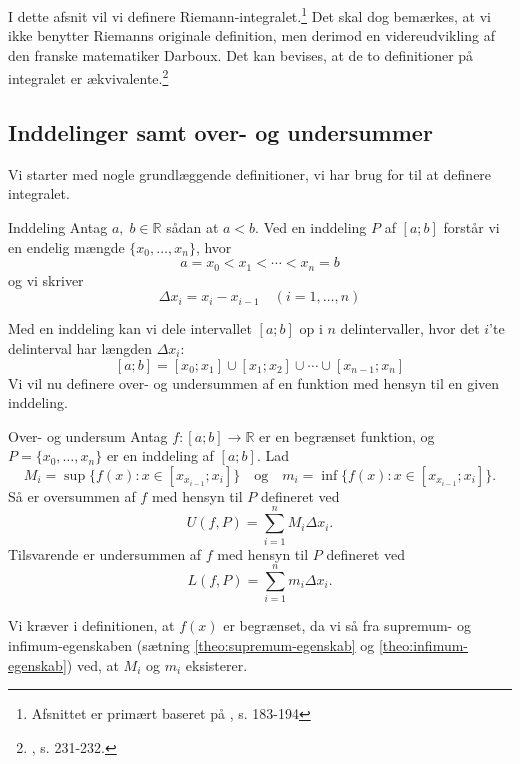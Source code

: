 I dette afsnit vil vi definere Riemann-integralet.\footnote{Afsnittet er primært baseret på \cite{Abbott2002}, s. 183-194}
Det skal dog bemærkes, at vi ikke benytter Riemanns originale definition, men derimod en videreudvikling af den franske matematiker Darboux.
Det kan bevises, at de to definitioner på integralet er ækvivalente.\footnote{\cite{Bartle2010}, s. 231-232.}

\subsection{Inddelinger samt over- og undersummer}%
  \label{sub:Inddelinger samt over- og undersummer}

Vi starter med nogle grundlæggende definitioner, vi har brug for til at definere integralet.
\begin{definition}{Inddeling}{}
  Antag $a,\;b \in \mathbb{R}$ sådan at $a <b$.
  Ved en inddeling $P$ af $[a;b]$ forstår vi en endelig mængde $\{x_0,\dotsc, x_n\}$, hvor
  \[
  a=x_0<x_1<\cdots<x_n=b
  \] 
  og vi skriver 
  \[
  \Delta x_i=x_i-x_{i-1} \quad (i=1,\ldots ,n)
  \]  
\end{definition}
Med en inddeling kan vi dele intervallet $[a;b]$ op i $n$ delintervaller, hvor det $i$'te delinterval har længden $\Delta x_i$:
\[
[a;b]=[x_0;x_1] \cup [x_1;x_2]\cup \cdots \cup [x _{n-1};x_n]
\] 
Vi vil nu definere over- og undersummen af en funktion med hensyn til en given inddeling.

\begin{definition}{Over- og undersum}{}
  Antag $f:[a;b] \to \mathbb{R}$ er en begrænset funktion, og $P=\{x_0,\ldots, x_n\}$ er en inddeling af $[a;b]$. 
  Lad 
  \[
  M_i=\sup \{ f(x):x \in [x _{x_{i-1}};x_i] \} \quad{\text{og}} \quad m_i=\inf \{ f(x):x \in [x _{x_{i-1}};x_i] \}.
  \] 
  Så er oversummen af $f$ med hensyn til $P$ defineret ved
  \[
  U(f,P)=\sum_{i=1}^{n} M_i \Delta x_i.
  \] 
  Tilsvarende er undersummen af $f$ med hensyn til $P$ defineret ved
  \[
  L(f,P)=\sum_{i=1}^{n} m_i \Delta x_i.
  \] 
\end{definition}

Vi kræver i definitionen, at $f(x)$ er begrænset, da vi så fra supremum- og infimum-egenskaben (sætning \ref{theo:supremum-egenskab} og \ref{theo:infimum-egenskab}) ved, at $M_i$ og $m_i$ eksisterer. 

